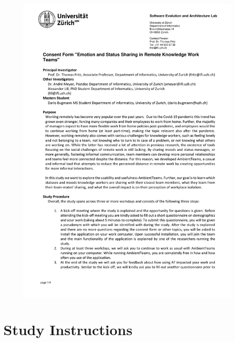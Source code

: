 \begin{figure}[h]
    \centering
    \includegraphics[width=\linewidth, page=4]{./documents/consent_form.pdf}
\end{figure}

\chapter{Study Instructions}
\label{chapter:study_instructions}

